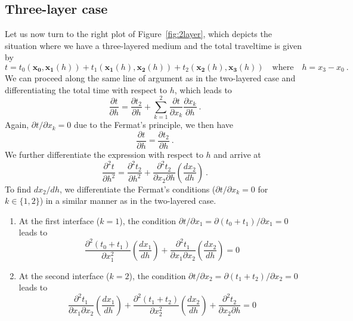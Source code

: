 \subsection{Three-layer case}

Let us now turn to the right plot of Figure~\ref{fig:2layer}, which depicts the situation where we have a three-layered medium and the total traveltime is given by
\begin{equation}
\label{eq:time3l}
t = t_0(\mathbf{x_0},\mathbf{x_1}(h)) + t_1(\mathbf{x_1}(h),\mathbf{x_2}(h)) + t_2(\mathbf{x_2}(h),\mathbf{x_3}(h)) \quad\text{where}\quad h = x_3-x_0~.
\end{equation}
We can proceed along the same line of argument as in the two-layered case and differentiating the total time with respect to $h$, which leads to
\begin{equation}
\frac{\partial t}{\partial h} = \frac{\partial t_2}{\partial h} +  \sum^2_{k=1} \frac{\partial t}{\partial x_k}  \frac{\partial x_k}{\partial h}~.
\end{equation}
Again, $\partial t / \partial x_k = 0$ due to the Fermat's principle, we then have
\begin{equation}
\frac{\partial t}{\partial h}  = \frac{\partial t_2}{\partial h}~.
\end{equation}
We further differentiate the expression with respect to $h$ and arrive at 
\begin{equation}
\label{eq:2d3l}
\frac{\partial^2 t}{\partial h^2} = \frac{\partial^2 t_2}{\partial h^2} + \frac{\partial^2 t_2}{\partial x_2 \partial h}\left( \frac{d x_2}{d h}\right) ~.
\end{equation}
To find $d x_2/ d h$, we differentiate the Fermat's conditions ($\partial t / \partial x_k = 0$ for $k \in \{1,2\}$) in a similar manner as in the two-layered case. 
\begin{enumerate}
\item  At the first interface ($k=1$), the condition $\partial t / \partial x_1 =  \partial ( t_0+t_1) / \partial x_1  =  0$ leads to 
\begin{equation}
\label{eq:cond1}
\frac{\partial^2 (t_0 + t_1)}{\partial x_1^2} \left( \frac{d x_1}{d h}\right) + \frac{\partial^2 t_1}{\partial x_1 \partial x_2} \left( \frac{d x_2}{d h}\right) = 0
\end{equation}
\item  At the second interface ($k=2$), the condition $\partial t / \partial x_2 =  \partial ( t_1+t_2) / \partial x_2  =  0$ leads to 
\begin{equation}
\label{eq:cond2}
\frac{\partial^2 t_1}{\partial x_1 \partial x_2} \left( \frac{d x_1}{d h}\right) + \frac{\partial^2 (t_1 + t_2)}{\partial x_2^2} \left( \frac{d x_2}{d h}\right) + \frac{\partial^2 t_2}{\partial x_2 \partial h} = 0
\end{equation}
\end{enumerate}
